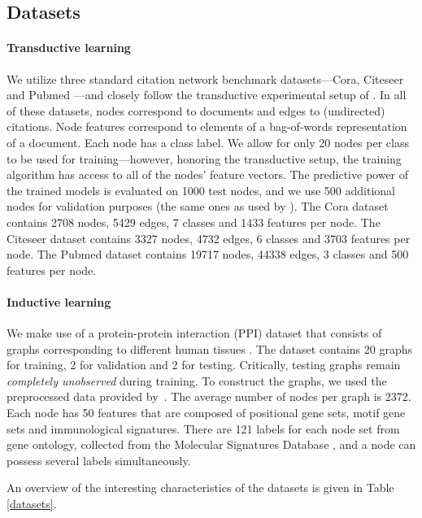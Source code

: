 \documentclass{article} %
\begin{document}
\subsection{Datasets}

\paragraph{Transductive learning}
We utilize three standard citation network benchmark datasets---Cora, Citeseer and Pubmed \citep{sen2008collective}---and closely follow the transductive experimental setup of \cite{yang2016revisiting}. In all of these datasets, nodes correspond to documents and edges to (undirected) citations. Node features correspond to elements of a bag-of-words representation of a document. Each node has a class label. We allow for only 20 nodes per class to be used for training---however, honoring the transductive setup, the training algorithm has access to all of the nodes' feature vectors. The predictive power of the trained models is evaluated on 1000 test nodes, and we use 500 additional nodes for validation purposes (the same ones as used by \cite{kipf2016semi}). The Cora dataset contains 2708 nodes, 5429 edges, 7 classes and 1433 features per node. The Citeseer dataset contains 3327 nodes, 4732 edges, 6 classes and 3703 features per node. The Pubmed dataset contains 19717 nodes, 44338 edges, 3 classes and 500 features per node.

\paragraph{Inductive learning}
We make use of a protein-protein interaction (PPI) dataset that consists of graphs corresponding to different human tissues \citep{zitnik2017predicting}. The dataset contains 20 graphs for training, 2 for validation and 2 for testing. Critically, testing graphs remain \emph{completely unobserved} during training. To construct the graphs, we used the preprocessed data provided by~\cite{hamilton2017inductive}. The average number of nodes per graph is 2372. Each node has 50 features that are composed of positional gene sets, motif gene sets and immunological
signatures. There are 121 labels for each node set from gene ontology, collected from the Molecular Signatures Database \citep{subramanian2005gene}, and a node can possess several labels simultaneously. 

An overview of the interesting characteristics of the datasets is given in Table \ref{datasets}.
\end{document}

